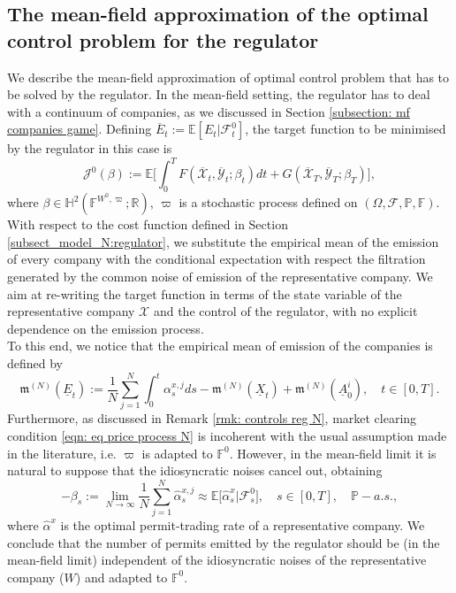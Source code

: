 \documentclass[10pt,a4paper]{amsart}
\numberwithin{equation}{section}
\newcommand{\w}{\varpi}
\newcommand{\E}{\mathbb{E}}
\newcommand{\F}{\mathbb{F}}
\newcommand{\R}{\mathbb{R}}
\newcommand{\ItF}{\mathcal{F}}
\newcommand{\prob}{\mathbb{P}}
\renewcommand{\bar}{\overline}
\renewcommand{\hat}{\widehat}
\begin{document}
\subsection{The mean-field approximation of the optimal control problem for the regulator}\label{subsection_mfg_regulator}
We describe the mean-field approximation of optimal control problem that has to be solved by the regulator. In the mean-field setting, the regulator has to deal with a continuum of companies, as we discussed in Section \ref{subsection: mf companies game}. Defining $\overline{E}_t := \mathbb{E}[E_t|\ItF^0_t]$, the target function to be minimised by the regulator in this case is
\begin{equation*}
\mathcal{J}^0(\beta) := \mathbb{E} \bigg[ \int_0^TF( \bar{\mathcal{X}}_t,  \bar{\mathcal{Y}}_t; \beta_t) dt + G(  \bar{\mathcal{X}}_T ,\bar{\mathcal{Y}}_T; \beta_T)\bigg],
\end{equation*} 
where $\beta\in \mathbb{H}^2(\F^{W^0,\w};\R)$, $\w$ is a stochastic process defined on $(\Omega,\ItF, \prob,\F)$. With respect to the cost function defined in Section \ref{subsect_model_N:regulator}, we substitute the empirical mean of the emission of every company with the conditional expectation with respect the filtration generated by the common noise of emission of the representative company. We aim at re-writing the target function in terms of the state variable of the representative company $\mathcal{X}$ and the control of the regulator, with no explicit dependence on the emission process. 
\\
To this end, we notice that the empirical mean of emission of the companies is defined by 
\begin{equation*}
\mathfrak{m}^{(N)}(\underline{E}_t) :=\frac{1}{N} \sum_{j = 1}^N \int_0^t\alpha^{x,j}_sds - \mathfrak{m}^{(N)}(\underline{X}_t) + \mathfrak{m}^{(N)}(\underline{A}^i_0),\quad t\in[0,T].
\end{equation*}
Furthermore, as discussed in Remark \ref{rmk: controls reg N}, market clearing condition \eqref{eqn: eq price process N} is incoherent with the usual assumption made in the literature, i.e. $\w$ is adapted to $\F^0$. However, in the mean-field limit it is natural to suppose that the idiosyncratic noises cancel out, obtaining
\begin{equation}
\label{eqn: mf market clearing} 
-\beta_s := \lim_{N\to\infty} \frac{1}{N}\sum_{j = 1}^N\hat\alpha^{x,j}_s \approx \E\big[\hat{\alpha}^{x}_s |\ItF^0_s\big],\quad s\in[0,T],\quad \prob-a.s.,
\end{equation}
where $\hat\alpha^x$ is the optimal permit-trading rate of a representative company. We conclude that the number of permits emitted by the regulator should be (in the mean-field limit) independent of the idiosyncratic noises of the representative company ($W$) and adapted to $\F^0$. 
\end{document}
